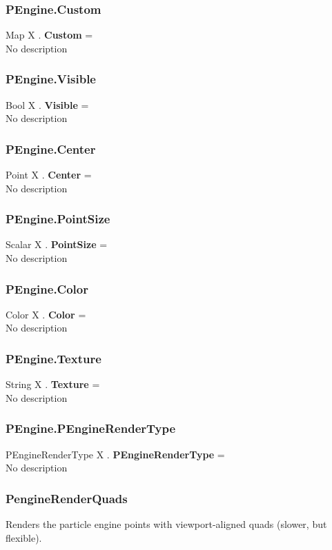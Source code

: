\subsubsection{PEngine.Custom \label{F:PEngine:Custom}}
Map X . \textbf{Custom} = \\
No description

\subsubsection{PEngine.Visible \label{F:PEngine:Visible}}
Bool X . \textbf{Visible} = \\
No description

\subsubsection{PEngine.Center \label{F:PEngine:Center}}
Point X . \textbf{Center} = \\
No description

\subsubsection{PEngine.PointSize \label{F:PEngine:PointSize}}
Scalar X . \textbf{PointSize} = \\
No description

\subsubsection{PEngine.Color \label{F:PEngine:Color}}
Color X . \textbf{Color} = \\
No description

\subsubsection{PEngine.Texture \label{F:PEngine:Texture}}
String X . \textbf{Texture} = \\
No description

\subsubsection{PEngine.PEngineRenderType \label{F:PEngine:PEngineRenderType}}
PEngineRenderType X . \textbf{PEngineRenderType} = \\
No description

\subsubsection{PengineRenderQuads \label{T:PEngineRenderType|PengineRenderQuads}}
Renders the particle engine points with viewport-aligned quads (slower, but flexible).


